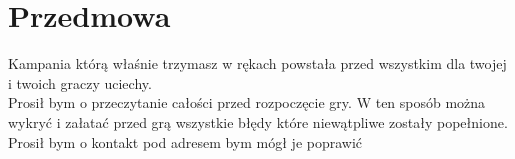 \chapter{Przedmowa}

Kampania którą właśnie trzymasz
w rękach powstała przed wszystkim
dla twojej i twoich graczy uciechy.\\
Prosił bym o przeczytanie całości przed rozpoczęcie gry.
W ten sposób można wykryć i załatać przed grą wszystkie
błędy które niewątpliwe zostały popełnione. Prosił bym
o kontakt pod adresem  bym mógł je
poprawić
